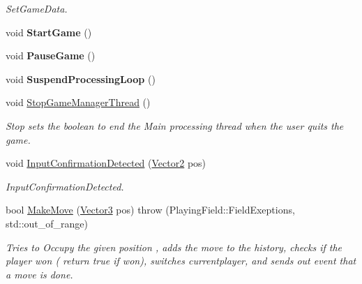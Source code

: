\begin{DoxyCompactItemize}
\begin{DoxyCompactList}\small\item\em Set\-Game\-Data. \end{DoxyCompactList}\item 
\hypertarget{classGameManager_a3af49a72977052275a1217c5018c737f}{void {\bfseries Start\-Game} ()}\label{classGameManager_a3af49a72977052275a1217c5018c737f}

\item 
\hypertarget{classGameManager_a6f108cd9cdd0cf101d19a151e5e76a26}{void {\bfseries Pause\-Game} ()}\label{classGameManager_a6f108cd9cdd0cf101d19a151e5e76a26}

\item 
\hypertarget{classGameManager_ac756f69d83f34849ed763c7de6b2d47f}{void {\bfseries Suspend\-Processing\-Loop} ()}\label{classGameManager_ac756f69d83f34849ed763c7de6b2d47f}

\item 
\hypertarget{classGameManager_a4e3d2ab486b782641640fb82b77963f2}{void \hyperlink{classGameManager_a4e3d2ab486b782641640fb82b77963f2}{Stop\-Game\-Manager\-Thread} ()}\label{classGameManager_a4e3d2ab486b782641640fb82b77963f2}

\begin{DoxyCompactList}\small\item\em Stop sets the boolean to end the Main processing thread when the user quits the game. \end{DoxyCompactList}\item 
void \hyperlink{classGameManager_ade855b10bc61465dfdfb458cf624cf97}{Input\-Confirmation\-Detected} (\hyperlink{structVector2}{Vector2} pos)
\begin{DoxyCompactList}\small\item\em Input\-Confirmation\-Detected. \end{DoxyCompactList}\item 
bool \hyperlink{classGameManager_ab5e866fc01d4d612cd1f84de0df4653f}{Make\-Move} (\hyperlink{structVector3}{Vector3} pos)  throw (\-Playing\-Field\-::\-Field\-Exeptions, std\-::out\-\_\-of\-\_\-range)
\begin{DoxyCompactList}\small\item\em Tries to Occupy the given position , adds the move to the history, checks if the player won ( return true if won), switches currentplayer, and sends out event that a move is done. \end{DoxyCompactList}\end{DoxyCompactItemize}


